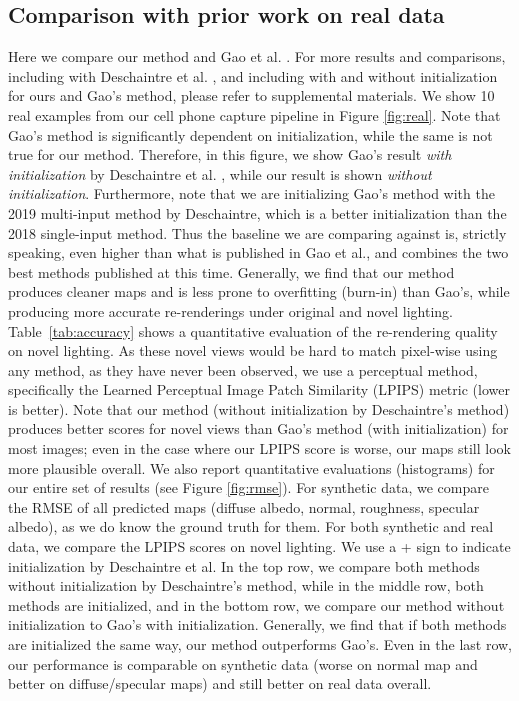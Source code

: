 \subsection{Comparison with prior work on real data}
\label{ssec:real}
%
Here we compare our method and Gao et al. . For more results and comparisons, including with Deschaintre et al. , and including with and without initialization for ours and Gao's method, please refer to supplemental materials.
%
We show 10 real examples from our cell phone capture pipeline in Figure \ref{fig:real}. Note that Gao's method is significantly dependent on initialization, while the same is not true for our method. Therefore, in this figure, we show Gao's result \emph{with initialization} by Deschaintre et al. , while our result is shown \emph{without initialization}.
%
Furthermore, note that we are initializing Gao's method with the 2019 multi-input method by Deschaintre, which is a better initialization than the 2018 single-input method. Thus the baseline we are comparing against is, strictly speaking, even higher than what is published in Gao et al., and combines the two best methods published at this time.
%
Generally, we find that our method produces cleaner maps and is less prone to overfitting (burn-in) than Gao's, while producing more accurate re-renderings under original and novel lighting. Table~\ref{tab:accuracy} shows a quantitative evaluation of the re-rendering quality on novel lighting. As these novel views would be hard to match pixel-wise using any method, as they have never been observed, we use a perceptual method, specifically the Learned Perceptual Image Patch Similarity (LPIPS) metric \cite{LPIPS} (lower is better). Note that our method (without initialization by Deschaintre's method) produces better scores for novel views than Gao's method (with initialization) for most images; even in the case where our LPIPS score is worse, our maps still look more plausible overall.
%
We also report quantitative evaluations (histograms) for our entire set of results (see Figure \ref{fig:rmse}). For synthetic data, we compare the RMSE of all predicted maps (diffuse albedo, normal, roughness, specular albedo), as we do know the ground truth for them. For both synthetic and real data, we compare the LPIPS scores on novel lighting. We use a + sign to indicate initialization by Deschaintre et al. In the top row, we compare both methods without initialization by Deschaintre's method, while in the middle row, both methods are initialized, and in the bottom row, we compare our method without initialization to Gao's with initialization. Generally, we find that if both methods are initialized the same way, our method outperforms Gao's. Even in the last row, our performance is comparable on synthetic data (worse on normal map and better on diffuse/specular maps) and still better on real data overall.
%

%
